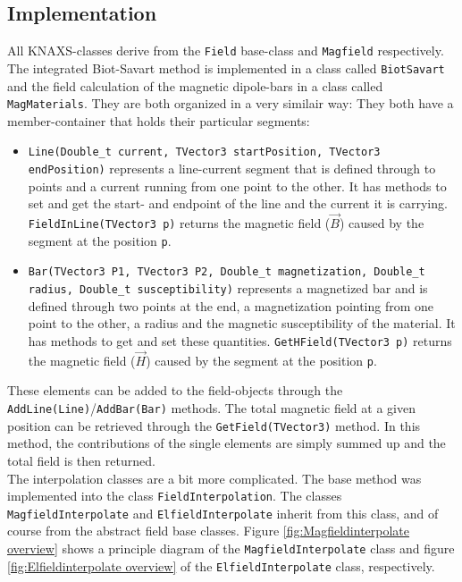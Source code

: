     \subsection{Implementation}
      All KNAXS-classes derive from the \texttt{Field} base-class and \texttt{Magfield} respectively. The integrated Biot-Savart method is implemented in a class called \texttt{BiotSavart} and the field calculation of the magnetic dipole-bars in a class called \texttt{MagMaterials}. They are both organized in a very similair way: They both have a member-container that holds their particular segments:
      \begin{itemize}
	\item \texttt{Line(Double\_t current, TVector3 startPosition, TVector3 endPosition)} represents a line-current segment that is defined through to points and a current running from one point to the other. It has methods to set and get the start- and endpoint of the line and the current it is carrying. \texttt{FieldInLine(TVector3 p)} returns the magnetic field ($\vec{B}$) caused by the segment at the position \texttt{p}.
	\item \texttt{Bar(TVector3 P1, TVector3 P2, Double\_t magnetization, Double\_t radius, Double\_t susceptibility)} represents a magnetized bar and is defined through two points at the end, a magnetization pointing from one point to the other, a radius and the magnetic susceptibility of the material. It has methods to get and set these quantities. \texttt{GetHField(TVector3 p)} returns the magnetic field ($\vec{H}$) caused by the segment at the position \texttt{p}.
      \end{itemize}
      These elements can be added to the field-objects through the \texttt{AddLine(Line)}/\texttt{AddBar(Bar)} methods. The total magnetic field at a given position can be retrieved through the \texttt{GetField(TVector3)} method. In this method, the contributions of the single elements are simply summed up and the total field is then returned.
      \\
      The interpolation classes are a bit more complicated. The base method was implemented into the class \texttt{FieldInterpolation}. The classes \texttt{MagfieldInterpolate} and \texttt{ElfieldInterpolate} inherit from this class, and of course from the abstract field base classes. Figure \ref{fig:Magfieldinterpolate overview} shows a principle diagram of the \texttt{MagfieldInterpolate} class and figure \ref{fig:Elfieldinterpolate overview} of the \texttt{ElfieldInterpolate} class, respectively.
